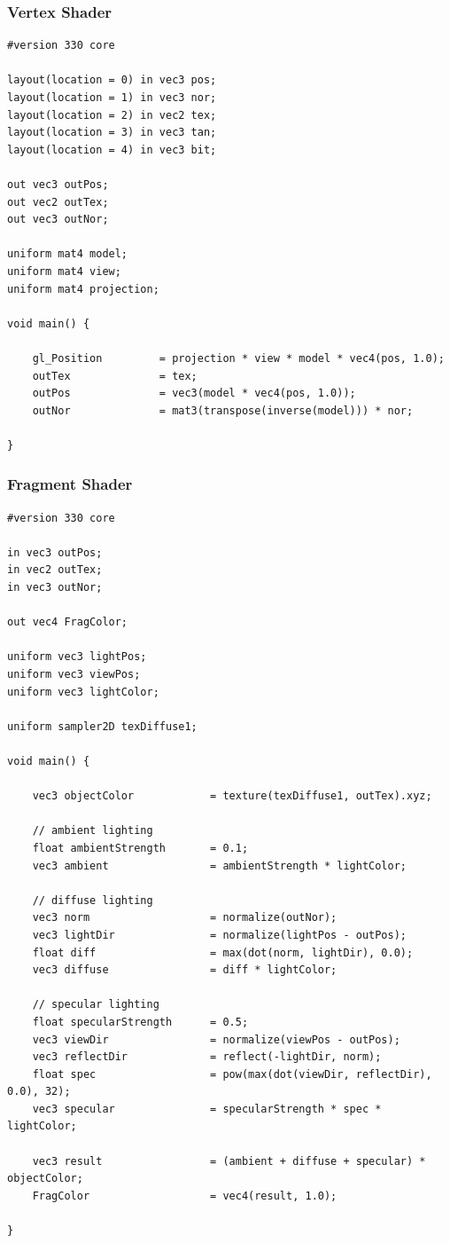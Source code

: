 \documentclass[titlepage, 11pt, a4paper, ngerman]{article}
\begin{document}
\subsubsection{Vertex Shader}
\begin{verbatim}
#version 330 core

layout(location = 0) in vec3 pos;
layout(location = 1) in vec3 nor;
layout(location = 2) in vec2 tex;
layout(location = 3) in vec3 tan;
layout(location = 4) in vec3 bit;

out vec3 outPos;
out vec2 outTex;
out vec3 outNor;

uniform mat4 model;
uniform mat4 view;
uniform mat4 projection;

void main() {

    gl_Position         = projection * view * model * vec4(pos, 1.0);
    outTex              = tex;
    outPos              = vec3(model * vec4(pos, 1.0));
    outNor              = mat3(transpose(inverse(model))) * nor;

}
\end{verbatim}

\subsubsection{Fragment Shader}
\begin{verbatim}
#version 330 core

in vec3 outPos;
in vec2 outTex;
in vec3 outNor;

out vec4 FragColor;

uniform vec3 lightPos; 
uniform vec3 viewPos; 
uniform vec3 lightColor;

uniform sampler2D texDiffuse1;

void main() {

    vec3 objectColor            = texture(texDiffuse1, outTex).xyz;

    // ambient lighting
    float ambientStrength       = 0.1;
    vec3 ambient                = ambientStrength * lightColor;
  	
    // diffuse lighting
    vec3 norm                   = normalize(outNor);
    vec3 lightDir               = normalize(lightPos - outPos);
    float diff                  = max(dot(norm, lightDir), 0.0);
    vec3 diffuse                = diff * lightColor;
    
    // specular lighting
    float specularStrength      = 0.5;
    vec3 viewDir                = normalize(viewPos - outPos);
    vec3 reflectDir             = reflect(-lightDir, norm);  
    float spec                  = pow(max(dot(viewDir, reflectDir), 0.0), 32);
    vec3 specular               = specularStrength * spec * lightColor;  
        
    vec3 result                 = (ambient + diffuse + specular) * objectColor;
    FragColor                   = vec4(result, 1.0);

}
\end{verbatim}
\end{document}

